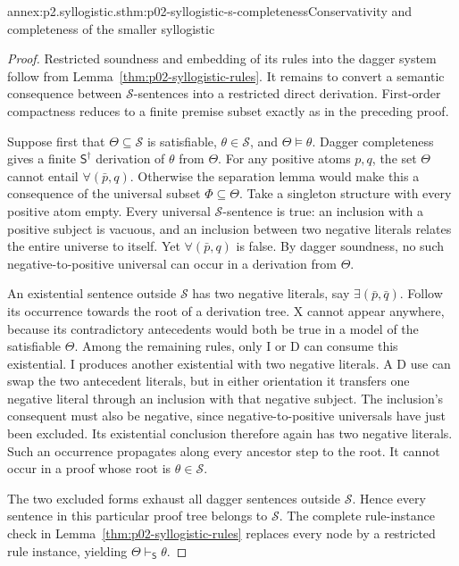 \begin{annexitem}{annex:p2.syllogistic.s}{thm:p02-syllogistic-s-completeness}{Conservativity and completeness of the smaller syllogistic}
\begin{proof}
Restricted soundness and embedding of its rules into the dagger system
follow from Lemma~\ref{thm:p02-syllogistic-rules}. It remains to convert
a semantic consequence between \(\mathcal S\)-sentences into a restricted
direct derivation. First-order compactness reduces to a finite premise
subset exactly as in the preceding proof.

Suppose first that \(\Theta\subseteq\mathcal S\) is satisfiable,
\(\theta\in\mathcal S\), and \(\Theta\models\theta\).
Dagger completeness gives a finite
\(\mathsf S^\dagger\) derivation of \(\theta\) from \(\Theta\).
For any positive atoms \(p,q\), the set \(\Theta\) cannot entail
\(\forall(\bar p,q)\). Otherwise the separation lemma would make this
a consequence of the universal subset \(\Phi\subseteq\Theta\).
Take a singleton structure with every positive atom empty. Every universal
\(\mathcal S\)-sentence is true: an inclusion with a positive subject is
vacuous, and an inclusion between two negative literals relates the entire
universe to itself. Yet \(\forall(\bar p,q)\) is false. By dagger
soundness, no such negative-to-positive universal can occur in a derivation
from \(\Theta\).

An existential sentence outside \(\mathcal S\) has two negative literals,
say \(\exists(\bar p,\bar q)\). Follow its occurrence towards the root
of a derivation tree. X cannot appear anywhere, because its contradictory
antecedents would both be true in a model of the satisfiable \(\Theta\).
Among the remaining rules, only I or D can consume this existential.
I produces another existential with two negative literals. A D use can
swap the two antecedent literals, but in either orientation it transfers
one negative literal through an inclusion with that negative subject.
The inclusion's consequent must also be negative, since negative-to-positive
universals have just been excluded. Its existential conclusion therefore
again has two negative literals. Such an occurrence propagates along every
ancestor step to the root. It cannot occur in a proof whose root is
\(\theta\in\mathcal S\).

The two excluded forms exhaust all dagger sentences outside \(\mathcal S\).
Hence every sentence in this particular proof tree belongs to
\(\mathcal S\). The complete rule-instance check in
Lemma~\ref{thm:p02-syllogistic-rules} replaces every node by a restricted
rule instance, yielding \(\Theta\vdash_{\mathsf S}\theta\).


\end{proof}
\end{annexitem}
